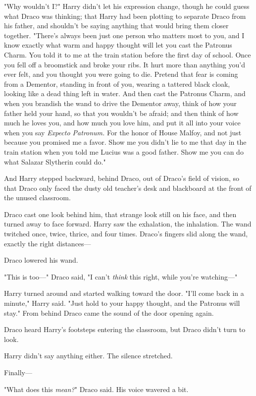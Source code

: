 "Why wouldn't I?" Harry didn't let his expression change, though he could guess
what Draco was thinking; that Harry had been plotting to separate Draco from
his father, and shouldn't be saying anything that would bring them closer
together. "There's always been just one person who matters most to you, and I
know exactly what warm and happy thought will let you cast the Patronus Charm.
You told it to me at the train station before the first day of school. Once you
fell off a broomstick and broke your ribs. It hurt more than anything you'd
ever felt, and you thought you were going to die. Pretend that fear is coming
from a Dementor, standing in front of you, wearing a tattered black cloak,
looking like a dead thing left in water. And then cast the Patronus Charm, and
when you brandish the wand to drive the Dementor away, think of how your father
held your hand, so that you wouldn't be afraid; and then think of how much he
loves you, and how much you love him, and put it all into your voice when you
say \emph{Expecto Patronum.} For the honor of House Malfoy, and not just
because you promised me a favor. Show me you didn't lie to me that day in the
train station when you told me Lucius was a good father. Show me you can do
what Salazar Slytherin could do."

And Harry stepped backward, behind Draco, out of Draco's field of vision, so
that Draco only faced the dusty old teacher's desk and blackboard at the front
of the unused classroom.

Draco cast one look behind him, that strange look still on his face, and then
turned away to face forward. Harry saw the exhalation, the inhalation. The wand
twitched once, twice, thrice, and four times. Draco's fingers slid along the
wand, exactly the right distances---

Draco lowered his wand.

"This is too---" Draco said, "I can't \emph{think} this right, while you're
watching---"

Harry turned around and started walking toward the door. "I'll come back in a
minute," Harry said. "Just hold to your happy thought, and the Patronus will
stay."
\sbreak
From behind Draco came the sound of the door opening again.

Draco heard Harry's footsteps entering the classroom, but Draco didn't turn to
look.

Harry didn't say anything either. The silence stretched.

Finally---

"What does this \emph{mean?}" Draco said. His voice wavered a bit.

